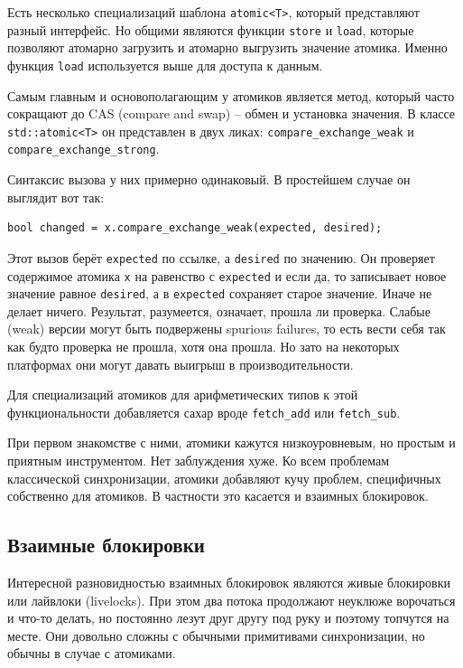 \documentclass[a4paper,12pt,oneside]{book}
\begin{document}
Есть несколько специализаций шаблона \lstinline!atomic<T>!, который представляют разный интерфейс. Но общими являются функции \lstinline!store! и \lstinline!load!, которые позволяют атомарно загрузить и атомарно выгрузить значение атомика. Именно функция \lstinline!load! используется выше для доступа к данным.

Самым главным и основополагающим у атомиков является метод, который часто сокращают до CAS (compare and swap) -- обмен и установка значения. В классе \lstinline!std::atomic<T>! он представлен в двух ликах: 
\lstinline!compare_exchange_weak! и \lstinline!compare_exchange_strong!.

Синтаксис вызова у них примерно одинаковый. В простейшем случае он выглядит вот так:

\begin{lstlisting}
bool changed = x.compare_exchange_weak(expected, desired);
\end{lstlisting}

Этот вызов берёт \lstinline!expected! по ссылке, а \lstinline!desired! по значению. Он проверяет содержимое атомика \lstinline!x! на равенство с \lstinline!expected! и если да, то записывает новое значение равное \lstinline!desired!, а в \lstinline!expected! сохраняет старое значение. Иначе не делает ничего. Результат, разумеется, означает, прошла ли проверка. Слабые (weak) версии могут быть подвержены spurious failures, то есть вести себя так как будто проверка не прошла, хотя она прошла. Но зато на некоторых платформах они могут давать выигрыш в производительности.

Для специализаций атомиков для арифметических типов к этой функциональности добавляется сахар вроде \lstinline!fetch_add! или \lstinline!fetch_sub!.

При первом знакомстве с ними, атомики кажутся низкоуровневым, но простым и приятным инструментом. Нет заблуждения хуже. Ко всем проблемам классической синхронизации, атомики добавляют кучу проблем, специфичных собственно для атомиков. В частности это касается и взаимных блокировок.

\subsection{Взаимные блокировки}\label{sub:livelock}

Интересной разновидностью взаимных блокировок являются живые блокировки или лайвлоки (livelocks). При этом два потока продолжают неуклюже ворочаться и что-то делать, но постоянно лезут друг другу под руку и поэтому топчутся на месте. Они довольно сложны с обычными примитивами синхронизации, но обычны в случае с атомиками.
\end{document}
